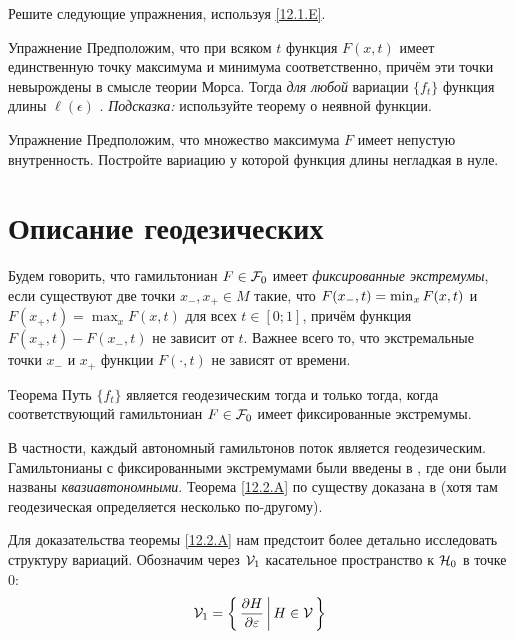 Решите следующие упражнения, используя \ref{12.1.E}.

\begin{ex}{Упражнение}\label{12.1.F}
Предположим, что при всяком $t$ функция $F(x, t)$ имеет единственную
точку максимума и минимума соответственно, причём эти точки
невырождены в смысле теории Морса. 
Тогда \textit{для любой} вариации $\{f_t\}$ функция длины
$\ell(\epsilon)$ . 
\emph{Подсказка:} используйте теорему о неявной функции.
\end{ex}

\begin{ex}{Упражнение}\label{12.1.G}
Предположим, что множество максимума $F$ имеет непустую внутренность.
Постройте вариацию у которой функция длины негладкая в нуле.
\end{ex}

\section{Описание геодезических}\label{sec:12.2}

Будем говорить, что гамильтониан $F\in \mathcal{F}_0$ имеет \emph{фиксированные экстремумы}, если существуют две точки $x_-, x_+\in M$ такие, что $F(x_-, t) \z= \min_x F(x, t)$ и $F(x_+, t) = \max_x F (x, t)$ для всех $t\in[0; 1]$, причём функция $F(x_+, t) - F(x_-, t)$ не зависит от $t$.
Важнее всего то, что экстремальные точки $x_-$ и $x_+$ функции $F(\cdot, t)$ не зависят от времени.

\begin{thm}{Теорема}\label{12.2.A}
Путь $\{f_t\}$ является геодезическим тогда и только тогда, когда соответствующий гамильтониан $F\in\mathcal{F}_0$ имеет фиксированные экстремумы.
\end{thm}

В частности, каждый автономный гамильтонов поток является геодезическим.
Гамильтонианы с фиксированными экстремумами были введены в \cite{BP1}, где они были названы \emph{квазиавтономными}.
Теорема \ref{12.2.A} по существу доказана в \cite{LM2} (хотя там геодезическая определяется несколько по-другому).

Для доказательства теоремы \ref{12.2.A} нам предстоит более детально исследовать структуру вариаций.
Обозначим через $\mathcal{V}_1$ касательное пространство к $\mathcal{H}_0$ в точке $0$: 
\[\mathcal{V}_1=\left\{ \,{\frac{\partial H}{\partial\varepsilon}}\, \middle| \,{H\in \mathcal{V}}\, \right\}\]

